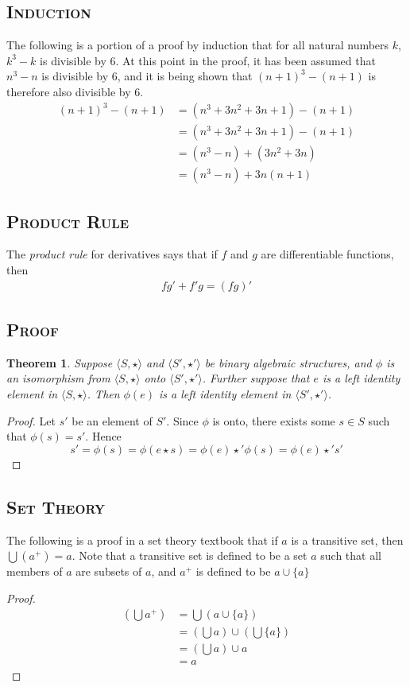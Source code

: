 \documentclass{article}
\newtheorem{theorem}{Theorem}
\begin{document}
\subsection{\textsc{Induction}}
The following is a portion of a proof by induction that for all natural numbers $k$, $k^3 - k$ is divisible by 6. At this point in the proof, it has been assumed that $n^3 - n$ is divisible by 6, and it is being shown that $(n+1)^3 - (n+1)$ is therefore also divisible by 6.\begin{align*}(n+1)^3 - (n + 1) &= (n^3 +3n^2 + 3n + 1) - (n + 1)\\&=(n^3 +3n^2 + 3n + 1) - (n + 1)\\&=(n^3 - n) + (3n^2 + 3n)\\&=(n^3 - n) + 3n(n+1)
\end{align*}
\subsection{\textsc{Product Rule}}
The \textit{product rule} for derivatives says that if $f$ and $g$ are differentiable functions, then
\begin{align*}
fg' + f'g = (fg)'
\end{align*}
\subsection{\textsc{Proof}}
\begin{theorem}Suppose $\langle S,\star\rangle$ and $\langle S',\star'\rangle$ be binary algebraic structures, and $\phi$ is an isomorphism from $\langle S,\star\rangle$ onto $\langle S',\star'\rangle$. Further suppose that $e$ is a left identity element in $\langle S,\star\rangle$. Then $\phi(e)$ is a left identity element in $\langle S',\star'\rangle$.\end{theorem}
        
\begin{proof}Let $s'$ be an element of $S'$. Since $\phi$ is onto, there exists some $s\in S$ such that $\phi(s) = s'$. Hence\begin{equation*}s' = \phi(s) = \phi(e\star s) = \phi(e)\star'\phi(s) = \phi(e)\star's'
\end{equation*}
\end{proof}
        
\subsection{\textsc{Set Theory}}
The following is a proof in a set theory textbook that if $a$ is a transitive set, then $\bigcup (a^+)=a$. Note that a transitive set is defined to be a set $a$ such that all members of $a$ are subsets of $a$, and $a^+$ is defined to be $a\cup \{a\}$\begin{proof}\begin{align*}(\bigcup a^+)&=\bigcup(a \cup \{a\})\\&=(\bigcup a)\cup(\bigcup \{a\})\\&=(\bigcup a)\cup a\\&=a
\end{align*}\end{proof}
\end{document}
